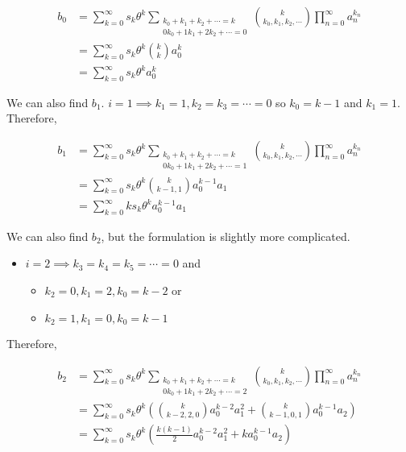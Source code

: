 \begin{align*}
    b_0 
    &= \sum_{k=0}^{\infty} s_k \theta^k \sum_{\substack{k_0 + k_1 + k_2 + \cdots = k \\ 0 k_0 + 1 k_1 + 2 k_2 + \cdots = 0}} \binom{k}{k_0, k_1, k_2, \cdots} \prod_{n=0}^{\infty} a_n^{k_n} \\
    &= \sum_{k=0}^{\infty} s_k \theta^k \binom{k}{k} a_0^{k} \\
    &= \sum_{k=0}^{\infty} s_k \theta^k a_0^k
\end{align*}

We can also find $b_1$. $i = 1 \implies k_1 = 1, k_2 = k_3 = \cdots = 0$ so $k_0 = k - 1$ and $k_1 = 1$. Therefore,

\begin{align*}
    b_1
    &= \sum_{k=0}^{\infty} s_k \theta^k \sum_{\substack{k_0 + k_1 + k_2 + \cdots = k \\ 0 k_0 + 1 k_1 + 2 k_2 + \cdots = 1}} \binom{k}{k_0, k_1, k_2, \cdots} \prod_{n=0}^{\infty} a_n^{k_n} \\
    &= \sum_{k=0}^{\infty} s_k \theta^k \binom{k}{k - 1, 1} a_0^{k - 1} a_1 \\
    &= \sum_{k=0}^{\infty} k s_k \theta^k a_0^{k-1} a_1
\end{align*}

We can also find $b_2$, but the formulation is slightly more complicated. 

\begin{itemize}
    \item $i = 2 \implies k_3 = k_4 = k_5 = \cdots = 0$ and
    \begin{itemize}
        \item $k_2 = 0, k_1 = 2, k_0 = k - 2$ or
        \item $k_2 = 1, k_1 = 0, k_0 = k - 1$
    \end{itemize}
\end{itemize}

Therefore,

\begin{align*}
    b_2
    &= \sum_{k=0}^{\infty} s_k \theta^k \sum_{\substack{k_0 + k_1 + k_2 + \cdots = k \\ 0 k_0 + 1 k_1 + 2 k_2 + \cdots = 2}} \binom{k}{k_0, k_1, k_2, \cdots} \prod_{n=0}^{\infty} a_n^{k_n} \\
    &= \sum_{k=0}^{\infty} s_k \theta^k \left(\binom{k}{k - 2, 2, 0}a_0^{k-2} a_1^{2} + \binom{k}{k - 1, 0, 1}a_0^{k-1} a_2\right) \\
    &= \sum_{k=0}^{\infty} s_k \theta^k \left(\frac{k(k-1)}{2} a_0^{k-2}a_1^{2} + k a_0^{k-1}a_2\right)
\end{align*}

